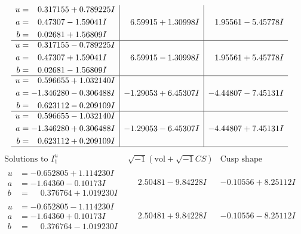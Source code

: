 \documentclass[1p]{elsarticle_modified}
\theoremstyle{definition}
\newcommand{\I}{\sqrt{-1}}
\begin{document}
$$\begin{array}{c|c|c}
\begin{aligned}
u &= \phantom{-}0.317155 + 0.789225 I \\
a &= \phantom{-}0.47307 - 1.59041 I \\
b &= \phantom{-}0.02681 + 1.56809 I\end{aligned}
 & \phantom{-}6.59915 + 1.30998 I & \phantom{-}1.95561 - 5.45778 I \\ \hline\begin{aligned}
u &= \phantom{-}0.317155 - 0.789225 I \\
a &= \phantom{-}0.47307 + 1.59041 I \\
b &= \phantom{-}0.02681 - 1.56809 I\end{aligned}
 & \phantom{-}6.59915 - 1.30998 I & \phantom{-}1.95561 + 5.45778 I \\ \hline\begin{aligned}
u &= \phantom{-}0.596655 + 1.032140 I \\
a &= -1.346280 - 0.306488 I \\
b &= \phantom{-}0.623112 - 0.209109 I\end{aligned}
 & -1.29053 + 6.45307 I & -4.44807 - 7.45131 I \\ \hline\begin{aligned}
u &= \phantom{-}0.596655 - 1.032140 I \\
a &= -1.346280 + 0.306488 I \\
b &= \phantom{-}0.623112 + 0.209109 I\end{aligned}
 & -1.29053 - 6.45307 I & -4.44807 + 7.45131 I\\
 \hline 
 \end{array}$$\newpage$$\begin{array}{c|c|c}  
\text{Solutions to }I^u_{1}& \I (\text{vol} + \sqrt{-1}CS) & \text{Cusp shape}\\
 \hline 
\begin{aligned}
u &= -0.652805 + 1.114230 I \\
a &= -1.64360 - 0.10173 I \\
b &= \phantom{-}0.376764 + 1.019230 I\end{aligned}
 & \phantom{-}2.50481 - 9.84228 I & -0.10556 + 8.25112 I \\ \hline\begin{aligned}
u &= -0.652805 - 1.114230 I \\
a &= -1.64360 + 0.10173 I \\
b &= \phantom{-}0.376764 - 1.019230 I\end{aligned}
 & \phantom{-}2.50481 + 9.84228 I & -0.10556 - 8.25112 I \\ \hline\begin{aligned}

\end{aligned}
\end{array}$$
\end{document}

